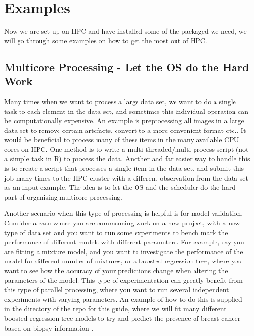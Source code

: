 \section{Examples}
Now we are set up on HPC and have installed some of the packaged we need, we will go through some examples on how to get the most out of HPC.
%
%
%
\subsection{Multicore Processing - Let the OS do the Hard Work}
%
%
Many times when we want to process a large data set, we want to do a single task to each element in the data set, and sometimes this individual operation can be computationally expensive. An example is preprocessing all images in a large data set to remove certain artefacts, convert to a more convenient format etc.. It would be beneficial to process many of these items in the many available CPU cores on HPC. One method is to write a multi-threaded/multi-process script (not a simple task in R) to process the data. Another and far easier way to handle this is to create a script that processes a single item in the data set, and submit this job many times to the HPC cluster with a different observation from the data set as an input example. The idea is to let the OS and the scheduler do the hard part of organising multicore processing.
%
%
%
\par
%
%
Another scenario when this type of processing is helpful is for model validation. Consider a case where you are commencing work on a new project, with a new type of data set and you want to run some experiments to bench mark the performance of different models with different parameters. For example, say you are fitting a mixture model, and you want to investigate the performance of the model for different number of mixtures, or a boosted regression tree, where you want to see how the accuracy of your predictions change when altering the parameters of the model. This type of experimentation can greatly benefit from this type of parallel processing, where you want to run several independent experiments with varying parameters. An example of how to do this is supplied in the  directory of the repo for this guide, where we will fit many different boosted regression tree models to try and predict the presence of breast cancer based on biopsy information \cite{breast}.
%
%
%
